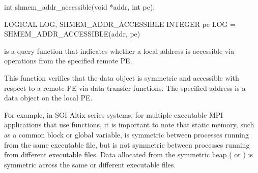 \synC

int shmem_addr_accessible(void *addr, int pe);

\synF
LOGICAL LOG, SHMEM_ADDR_ACCESSIBLE
INTEGER pe
LOG = SHMEM_ADDR_ACCESSIBLE(addr, pe)


{
         is  a  query  function  that indicates whether a
       local address is accessible via \openshmem operations  from the  specified
       remote \ac{PE}.
       
       This function verifies that the data object is symmetric and accessible
       with respect to a remote \ac{PE} via \openshmem  data  transfer  functions.   The
       specified address  is a data object on the local \ac{PE}.

       For example, in  SGI Altix series systems, for multiple executable MPI applications
       that use \openshmem functions, it is important to note that  static  memory,
       such  as a  \Fortran{}  common  block  or \Clang{} global variable, is symmetric
       between processes running from the same executable  file,  but  is  not
       symmetric  between  processes  running from different executable files.
       Data allocated from  the symmetric  heap  ( or	)  is
       symmetric across the same or different executable files.
}
{
}
\eAPI
